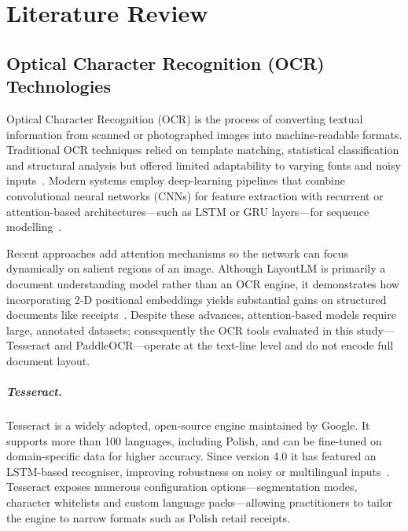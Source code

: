 \documentclass{SGGW-thesis-EN}
\begin{document}
\chapter{Literature Review}

\section{Optical Character Recognition (OCR) Technologies}

Optical Character Recognition (OCR) is the process of converting textual information
from scanned or photographed images into machine-readable formats.
Traditional OCR techniques relied on template matching, statistical classification and
structural analysis but offered limited adaptability to varying fonts and noisy inputs~\cite{ocrsystems}.
Modern systems employ deep-learning pipelines that combine convolutional neural networks
(CNNs) for feature extraction with recurrent or attention-based architectures—such as
LSTM or GRU layers—for sequence modelling~\cite{shi2017e2eseq}.

Recent approaches add attention mechanisms so the network can focus dynamically on
salient regions of an image.
Although LayoutLM is primarily a document understanding model rather than an OCR engine,
it demonstrates how incorporating 2-D positional embeddings yields substantial gains on
structured documents like receipts~\cite{li2020layoutlm}.
Despite these advances, attention-based models require large, annotated datasets;
consequently the OCR tools evaluated in this study—Tesseract and PaddleOCR—operate at the
text-line level and do not encode full document layout.

\paragraph{Tesseract.}
Tesseract is a widely adopted, open-source engine maintained by Google.
It supports more than 100 languages, including Polish, and can be fine-tuned on
domain-specific data for higher accuracy.
Since version 4.0 it has featured an LSTM-based recogniser, improving robustness on
noisy or multilingual inputs~\cite{smith2007overview,smith2013history}.
Tesseract exposes numerous configuration options—segmentation modes, character
whitelists and custom language packs—allowing practitioners to tailor the engine to
narrow formats such as Polish retail receipts.
\end{document}
